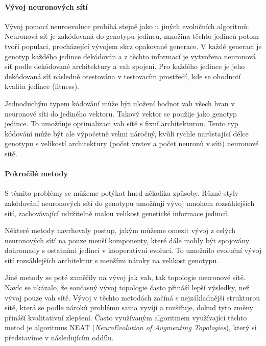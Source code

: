 \paragraph{Vývoj neuronových sítí}
Vývoj pomocí neuroevoluce probíhá stejně jako u jiných evolučních algoritmů.
Neuronová síť je zakódovaná do genotypu jedinců, množina těchto jedinců potom
tvoří populaci, procházející vývojem skrz opakované generace. V každé generaci
je genotyp každého jedince dekódován a z těchto informací je vytvořena
neuronová síť podle dekódované architektury a vah spojení. Pro každého jedince
je jeho dekódovaná síť následně otestována v testovacím prostředí, kde se
ohodnotí kvalita jedince (fitness).

Jednoduchým typem kódování může být uložení hodnot vah všech hran v neuronové
síti do jediného vektoru. Takový vektor se použije jako genotyp jedince. To
umožňuje optimalizaci vah sítě s fixní architekturou. Tento typ kódování může
být ale výpočetně velmi náročný, kvůli rychle narůstající délce genotypu s
velikostí architektury (počet vrstev a počet neuronů v síti) neuronové sítě.

\paragraph{Pokročilé metody}
S těmito problémy se můžeme potýkat hned několika způsoby. Různé styly
zakódování neuronových sítí do genotypu umožňují vývoj mnohem
rozsáhlejších sítí, zachovávající udržitelně malou velikost genetické
informace jedinců. 

Některé metody \citet{gomez2008accelerated} navrhovaly postup, jakým můžeme
omezit vývoj z celých neuronových sítí na pouze menší komponenty, které dále
mohly být spojovány dohromady s ostatními jedinci v kooperativní evoluci. To
umožnilo evoluční vývoj sítí rozsáhlejších architektur s menšími nároky na
velikost genotypu.

Jiné metody se poté zaměřily na vývoj jak vah, tak topologie neuronové sítě.
Navíc se ukázalo, že současný vývoj topologie často přináší lepší výsledky, než
vývoj pouze vah sítě. Vývoj v těchto metodách začíná s nejzákladnější
strukturou sítě, která se podle nároků problému sama vyvíjí a rozšiřuje, dokud
tyto změny přináší kvalitativní zlepšení. Často využívaným algoritmem
využívající těchto metod je algoritmus NEAT (\emph{NeuroEvolution of Augmenting
Topologies}), který si představíme v následujícím oddílu.

